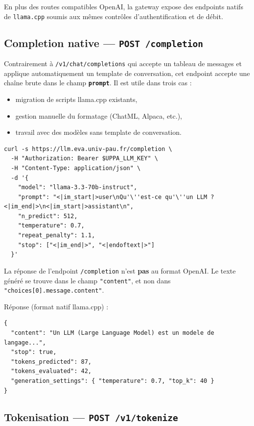 \documentclass[12pt, a4paper, twoside]{article}
\newcommand{\api}[1]{\texttt{#1}}
\newcommand{\param}[1]{\texttt{\textbf{#1}}}
\begin{document}
En plus des routes compatibles OpenAI, la gateway expose des endpoints natifs de
\texttt{llama.cpp} soumis aux mêmes contrôles d'authentification et de débit.

\subsection{Completion native — \texttt{POST /completion}}

Contrairement à \api{/v1/chat/completions} qui accepte un tableau de messages et applique
automatiquement un template de conversation, cet endpoint accepte une chaîne brute dans
le champ \param{prompt}. Il est utile dans trois cas :
\begin{itemize}
  \item migration de scripts llama.cpp existants,
  \item gestion manuelle du formatage (ChatML, Alpaca, etc.),
  \item travail avec des modèles sans template de conversation.
\end{itemize}

\begin{lstlisting}[style=bashstyle, caption={Completion native avec curl}]
curl -s https://llm.eva.univ-pau.fr/completion \
  -H "Authorization: Bearer $UPPA_LLM_KEY" \
  -H "Content-Type: application/json" \
  -d '{
    "model": "llama-3.3-70b-instruct",
    "prompt": "<|im_start|>user\nQu'\''est-ce qu'\''un LLM ?<|im_end|>\n<|im_start|>assistant\n",
    "n_predict": 512,
    "temperature": 0.7,
    "repeat_penalty": 1.1,
    "stop": ["<|im_end|>", "<|endoftext|>"]
  }'
\end{lstlisting}

\begin{warning}
  La réponse de l'endpoint \api{/completion} n'est \textbf{pas} au format OpenAI.
  Le texte généré se trouve dans le champ \texttt{"content"}, et non dans
  \texttt{"choices[0].message.content"}.
\end{warning}

Réponse (format natif llama.cpp) :
\begin{lstlisting}[style=jsonstyle]
{
  "content": "Un LLM (Large Language Model) est un modele de langage...",
  "stop": true,
  "tokens_predicted": 87,
  "tokens_evaluated": 42,
  "generation_settings": { "temperature": 0.7, "top_k": 40 }
}
\end{lstlisting}

\subsection{Tokenisation — \texttt{POST /v1/tokenize}}
\end{document}
